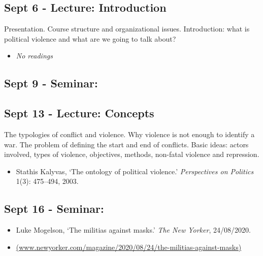 \documentclass[12pt, a4paper]{article}
\begin{document}
\subsection*{Sept 6 - Lecture: Introduction}

Presentation. Course structure and organizational issues. Introduction: what is political violence and what are we going to talk about?

\begin{itemize}
\setlength\itemsep{-5pt}
\item \textit{No readings}
\end{itemize}

\subsection*{Sept 9 - Seminar: {\color{red}{No class}}}

\subsection*{Sept 13 - Lecture: Concepts}

The typologies of conflict and violence. Why violence is not enough to identify a war. The problem of defining the start and end of conflicts. Basic ideas: actors involved, types of violence, objectives, methods, non-fatal violence and repression.

\begin{itemize}
\setlength\itemsep{0pt}
\item Stathis Kalyvas, `The ontology of political violence.' \textit{Perspectives on Politics} 1(3): 475--494, 2003.
\end{itemize}

\subsection*{Sept 16 - Seminar:}

\begin{itemize}
\setlength\itemsep{-5pt}
\item Luke Mogelson, `The militias against masks.' \textit{The New Yorker}, 24/08/2020.
\item[] \href{https://www.newyorker.com/magazine/2020/08/24/the-militias-against-masks}{(www.newyorker.com/magazine/2020/08/24/the-militias-against-masks)}
\end{itemize}

\end{document}
